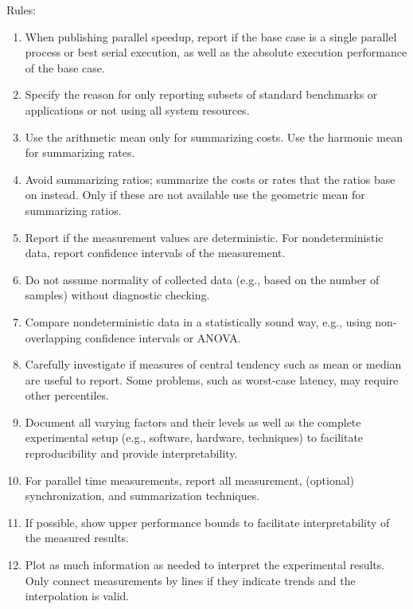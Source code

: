 Rules:
\begin{enumerate}
    \item When publishing parallel speedup, report if the base case is a single parallel process or best serial execution, as well as the absolute execution performance of the base case.
    \item Specify the reason for only reporting subsets of standard benchmarks or applications or not using all system resources.
    \item Use the arithmetic mean only for summarizing costs. Use the harmonic mean for summarizing rates.
    \item Avoid summarizing ratios; summarize the costs or rates that the ratios base on instead. Only if these are not available use the geometric mean for summarizing ratios.
    \item Report if the measurement values are deterministic. For nondeterministic data, report confidence intervals of the measurement.
    \item Do not assume normality of collected data (e.g., based on the number of samples) without diagnostic checking.
    \item Compare nondeterministic data in a statistically sound way, e.g., using non-overlapping confidence intervals or ANOVA.
    \item Carefully investigate if measures of central tendency such as mean or median are useful to report. Some problems, such as worst-case latency, may require other percentiles.
    \item Document all varying factors and their levels as well as the complete experimental setup (e.g., software, hardware, techniques) to facilitate reproducibility and provide interpretability.
    \item For parallel time measurements, report all measurement, (optional) synchronization, and summarization techniques.
    \item If possible, show upper performance bounds to facilitate interpretability of the measured results.
    \item Plot as much information as needed to interpret the experimental results. Only connect measurements by lines if they indicate trends and the interpolation is valid.
\end{enumerate}

